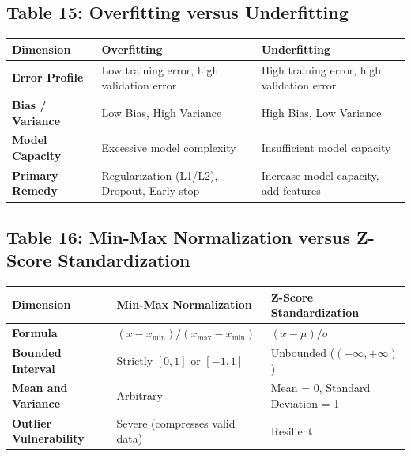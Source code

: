 \subsection*{Table 15: Overfitting versus Underfitting}
\begin{center}
\small
\begin{tabularx}{\textwidth}{lXX}
\toprule
\textbf{Dimension} & \textbf{Overfitting} & \textbf{Underfitting} \\
\midrule
\textbf{Error Profile} & Low training error, high validation error & High training error, high validation error \\
\textbf{Bias / Variance} & Low Bias, High Variance & High Bias, Low Variance \\
\textbf{Model Capacity} & Excessive model complexity & Insufficient model capacity \\
\textbf{Primary Remedy} & Regularization (L1/L2), Dropout, Early stop & Increase model capacity, add features \\
\bottomrule
\end{tabularx}
\end{center}

\subsection*{Table 16: Min-Max Normalization versus Z-Score Standardization}
\begin{center}
\small
\begin{tabularx}{\textwidth}{lXX}
\toprule
\textbf{Dimension} & \textbf{Min-Max Normalization} & \textbf{Z-Score Standardization} \\
\midrule
\textbf{Formula} & $(x - x_{\min}) / (x_{\max} - x_{\min})$ & $(x - \mu) / \sigma$ \\
\textbf{Bounded Interval} & Strictly $[0, 1]$ or $[-1, 1]$ & Unbounded ($(-\infty, +\infty)$) \\
\textbf{Mean and Variance} & Arbitrary & Mean = 0, Standard Deviation = 1 \\
\textbf{Outlier Vulnerability} & Severe (compresses valid data) & Resilient \\
\bottomrule
\end{tabularx}
\end{center}

